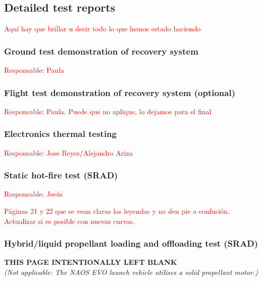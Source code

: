 \documentclass[11pt, a4paper]{article} %
\begin{document}
\subsection{Detailed test reports} \textcolor{red}{Aquí hay que brillar u decir todo lo que hemos estado haciendo}

\subsubsection{Ground test demonstration of recovery system} \textcolor{red}{Responsable: Paula}

\subsubsection{Flight test demonstration of recovery system (optional)} \textcolor{red}{Responsable: Paula. Puede que no aplique, lo dejamos para el final}

\subsubsection{Electronics thermal testing} \textcolor{red}{Responsable: Jose Reyes/Alejandro Ariza}

\subsubsection{Static hot-fire test (SRAD)} \textcolor{red}{Responsable: Jesús}

\vspace{1cm}

\textcolor{red}{Páginas 21 y 22 que se vean claras las leyendas y no den pie a confusión. Actualizar si es posible con nuevas curvas.}

\subsubsection{Hybrid/liquid propellant loading and offloading test (SRAD)}
\vspace*{\fill}
\begin{center}
    \textbf{THIS PAGE INTENTIONALLY LEFT BLANK} \\
    \vspace{0.5cm}
    \textit{(Not applicable: The NAOS EVO launch vehicle utilises a solid propellant motor.)}
\end{center}
\vspace*{\fill}
\newpage
\end{document}
